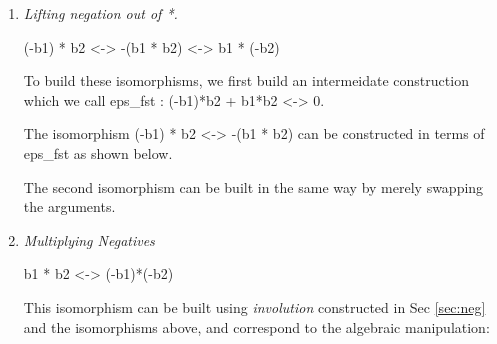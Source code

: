 \documentclass[preprint]{sigplanconf}
\begin{document}
\begin{enumerate}



\item 
\emph{Lifting negation out of {{*}}. }

{{(-b1) * b2 <-> -(b1 * b2) <-> b1 * (-b2)}}

To build these isomorphisms, we first build an intermeidate
construction which we call {{eps_{fst} : (-b1)*b2 + b1*b2 <-> 0}}. 
\begin{center}
\end{center}

The isomorphism {{(-b1) * b2 <-> -(b1 * b2)}} can be constructed in
terms of {{eps_{fst} }} as shown below. 

\begin{center}
\end{center}  

The second isomorphism can be built in the same way by merely swapping
the arguments. 

\item
\emph{Multiplying Negatives}

{{b1 * b2 <-> (-b1)*(-b2)}}

This isomorphism can be built using \emph{involution} constructed in
Sec \ref{sec:neg} and the isomorphisms above, and correspond to the
algebraic manipulation:





\end{enumerate}
\end{document}
